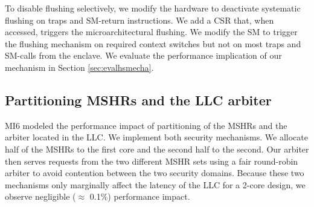 To disable flushing selectively, we modify the hardware to deactivate systematic flushing on traps and SM-return instructions.
We add a CSR that, when accessed, triggers the microarchitectural flushing.
We modify the SM to trigger the flushing mechanism on required context switches but not on most traps and SM-calls from the enclave.
We evaluate the performance implication of our mechanism in Section \ref{sec:evalhsmecha}. 


\subsection{Partitioning MSHRs and the LLC arbiter}

MI6 modeled the performance impact of partitioning of the MSHRs and the arbiter located in the LLC.
We implement both security mechanisms.
We allocate half of the MSHRs to the first core and the second half to the second. Our arbiter then serves requests from the two different MSHR sets using a fair round-robin arbiter to avoid contention between the two security domains.
Because these two mechanisms only marginally affect the latency of the LLC for a 2-core design, we observe negligible ($\approx$ 0.1\%) performance impact.